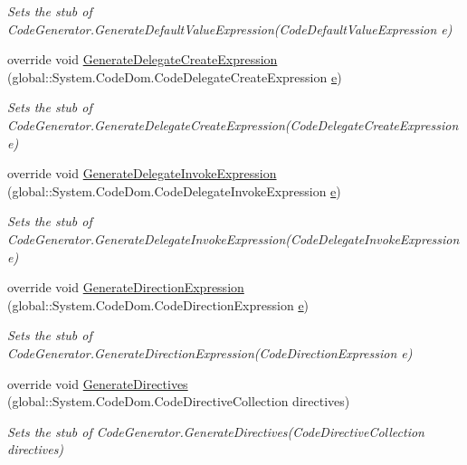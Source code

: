 \begin{DoxyCompactItemize}
\begin{DoxyCompactList}\small\item\em Sets the stub of Code\-Generator.\-Generate\-Default\-Value\-Expression(\-Code\-Default\-Value\-Expression e)\end{DoxyCompactList}\item 
override void \hyperlink{class_system_1_1_code_dom_1_1_compiler_1_1_fakes_1_1_stub_code_generator_aba10566ec5e8ede6854c80ae12a4c159}{Generate\-Delegate\-Create\-Expression} (global\-::\-System.\-Code\-Dom.\-Code\-Delegate\-Create\-Expression \hyperlink{jquery-1_810_82_8min_8js_a2c038346d47955cbe2cb91e338edd7e1}{e})
\begin{DoxyCompactList}\small\item\em Sets the stub of Code\-Generator.\-Generate\-Delegate\-Create\-Expression(\-Code\-Delegate\-Create\-Expression e)\end{DoxyCompactList}\item 
override void \hyperlink{class_system_1_1_code_dom_1_1_compiler_1_1_fakes_1_1_stub_code_generator_a65f6b6757aa815cc8ab6ce762334040a}{Generate\-Delegate\-Invoke\-Expression} (global\-::\-System.\-Code\-Dom.\-Code\-Delegate\-Invoke\-Expression \hyperlink{jquery-1_810_82_8min_8js_a2c038346d47955cbe2cb91e338edd7e1}{e})
\begin{DoxyCompactList}\small\item\em Sets the stub of Code\-Generator.\-Generate\-Delegate\-Invoke\-Expression(\-Code\-Delegate\-Invoke\-Expression e)\end{DoxyCompactList}\item 
override void \hyperlink{class_system_1_1_code_dom_1_1_compiler_1_1_fakes_1_1_stub_code_generator_a7dce2e5a42e3a3787623b5345d4ef727}{Generate\-Direction\-Expression} (global\-::\-System.\-Code\-Dom.\-Code\-Direction\-Expression \hyperlink{jquery-1_810_82_8min_8js_a2c038346d47955cbe2cb91e338edd7e1}{e})
\begin{DoxyCompactList}\small\item\em Sets the stub of Code\-Generator.\-Generate\-Direction\-Expression(\-Code\-Direction\-Expression e)\end{DoxyCompactList}\item 
override void \hyperlink{class_system_1_1_code_dom_1_1_compiler_1_1_fakes_1_1_stub_code_generator_a6be8d8403fc2090ac6ce0eb0ef2aa04f}{Generate\-Directives} (global\-::\-System.\-Code\-Dom.\-Code\-Directive\-Collection directives)
\begin{DoxyCompactList}\small\item\em Sets the stub of Code\-Generator.\-Generate\-Directives(\-Code\-Directive\-Collection directives)\end{DoxyCompactList}\item 

\end{DoxyCompactItemize}
